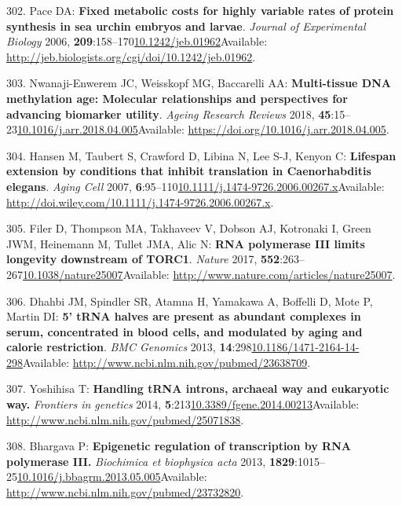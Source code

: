 \documentclass[
]{book}
\begin{document}
\leavevmode\hypertarget{ref-Pace2006}{}%
302. Pace DA: \textbf{Fixed metabolic costs for highly variable rates of protein synthesis in sea urchin embryos and larvae}. \emph{Journal of Experimental Biology} 2006, \textbf{209}:158--170\href{https://doi.org/10.1242/jeb.01962}{10.1242/jeb.01962}Available: \url{http://jeb.biologists.org/cgi/doi/10.1242/jeb.01962}.

\leavevmode\hypertarget{ref-Nwanaji-Enwerem2018}{}%
303. Nwanaji-Enwerem JC, Weisskopf MG, Baccarelli AA: \textbf{Multi-tissue DNA methylation age: Molecular relationships and perspectives for advancing biomarker utility}. \emph{Ageing Research Reviews} 2018, \textbf{45}:15--23\href{https://doi.org/10.1016/j.arr.2018.04.005}{10.1016/j.arr.2018.04.005}Available: \url{https://doi.org/10.1016/j.arr.2018.04.005}.

\leavevmode\hypertarget{ref-Hansen2007}{}%
304. Hansen M, Taubert S, Crawford D, Libina N, Lee S-J, Kenyon C: \textbf{Lifespan extension by conditions that inhibit translation in Caenorhabditis elegans}. \emph{Aging Cell} 2007, \textbf{6}:95--110\href{https://doi.org/10.1111/j.1474-9726.2006.00267.x}{10.1111/j.1474-9726.2006.00267.x}Available: \url{http://doi.wiley.com/10.1111/j.1474-9726.2006.00267.x}.

\leavevmode\hypertarget{ref-Filer2017}{}%
305. Filer D, Thompson MA, Takhaveev V, Dobson AJ, Kotronaki I, Green JWM, Heinemann M, Tullet JMA, Alic N: \textbf{RNA polymerase III limits longevity downstream of TORC1}. \emph{Nature} 2017, \textbf{552}:263--267\href{https://doi.org/10.1038/nature25007}{10.1038/nature25007}Available: \url{http://www.nature.com/articles/nature25007}.

\leavevmode\hypertarget{ref-Dhahbi2013}{}%
306. Dhahbi JM, Spindler SR, Atamna H, Yamakawa A, Boffelli D, Mote P, Martin DI: \textbf{5' tRNA halves are present as abundant complexes in serum, concentrated in blood cells, and modulated by aging and calorie restriction}. \emph{BMC Genomics} 2013, \textbf{14}:298\href{https://doi.org/10.1186/1471-2164-14-298}{10.1186/1471-2164-14-298}Available: \url{http://www.ncbi.nlm.nih.gov/pubmed/23638709}.

\leavevmode\hypertarget{ref-Bhargava2013a}{}%
307. Yoshihisa T: \textbf{Handling tRNA introns, archaeal way and eukaryotic way.} \emph{Frontiers in genetics} 2014, \textbf{5}:213\href{https://doi.org/10.3389/fgene.2014.00213}{10.3389/fgene.2014.00213}Available: \url{http://www.ncbi.nlm.nih.gov/pubmed/25071838}.

\leavevmode\hypertarget{ref-Park2017}{}%
308. Bhargava P: \textbf{Epigenetic regulation of transcription by RNA polymerase III.} \emph{Biochimica et biophysica acta} 2013, \textbf{1829}:1015--25\href{https://doi.org/10.1016/j.bbagrm.2013.05.005}{10.1016/j.bbagrm.2013.05.005}Available: \url{http://www.ncbi.nlm.nih.gov/pubmed/23732820}.
\end{document}

